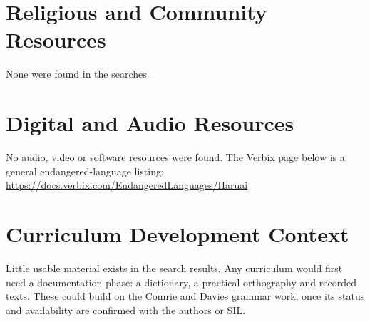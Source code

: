 \documentclass[12pt]{article}
\begin{document}
\section{Religious and Community Resources}
None were found in the searches.

\section{Digital and Audio Resources}
No audio, video or software resources were found. The Verbix page below is a general endangered-language listing: \url{https://docs.verbix.com/EndangeredLanguages/Haruai}

\section{Curriculum Development Context}
Little usable material exists in the search results. Any curriculum would first need a documentation phase: a dictionary, a practical orthography and recorded texts. These could build on the Comrie and Davies grammar work, once its status and availability are confirmed with the authors or SIL.
\end{document}
